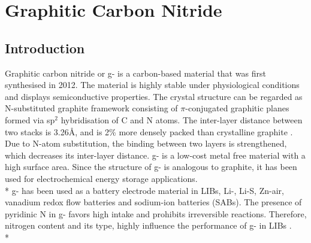 \section{Graphitic Carbon Nitride}

\subsection{Introduction}
Graphitic carbon nitride or g- is a carbon-based material that was first synthesised in 2012. The material is highly stable under physiological conditions and displays semiconductive properties. The crystal structure can be regarded as N-substituted graphite framework consisting of $\pi$-conjugated graphitic planes formed via sp$^2$ hybridisation of C and N atoms. The inter-layer distance between two stacks is 3.26\AA, and is 2\% more densely packed than crystalline graphite \cite{zheng_graphitic_2012}. Due to N-atom substitution, the binding between two layers is strengthened, which decreases its inter-layer distance. g- is a low-cost metal free material with a high surface area. Since the structure of g- is analogous to graphite, it has been used for electrochemical energy storage applications. \\*
g- has been used as a battery electrode material in LIBs, Li-, Li-S, Zn-air, vanadium redox flow batteries and sodium-ion batteries (SABs). The presence of pyridinic N in g- favors high  intake and prohibits irreversible reactions. Therefore, nitrogen content and its type, highly influence the performance of g- in LIBs \cite{shah_highly_2017}. \\*
